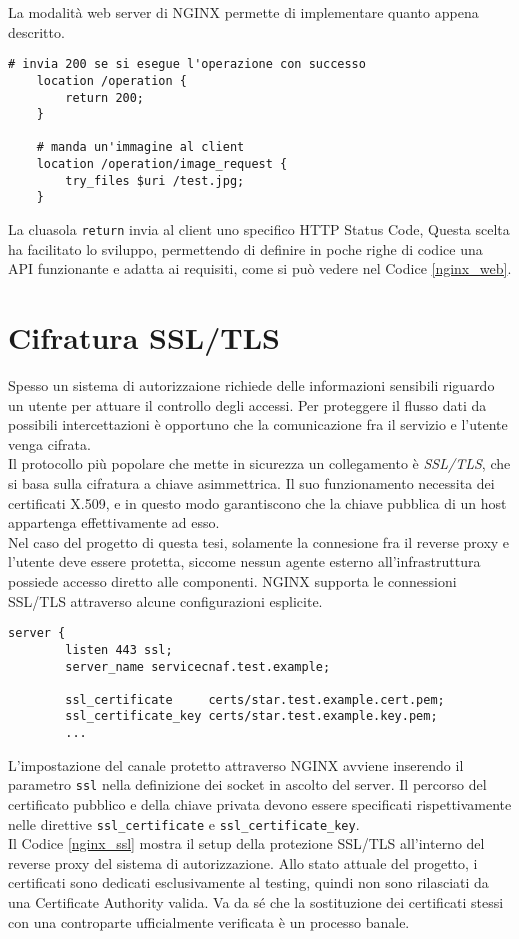 La modalità web server di NGINX permette di implementare quanto appena descritto.
\lstset{language=nginx}
\begin{lstlisting}[caption={Frammento di codice dell'application server},captionpos=b,label=nginx_web]
    # invia 200 se si esegue l'operazione con successo
    location /operation {
        return 200;
    }

    # manda un'immagine al client
    location /operation/image_request {
        try_files $uri /test.jpg;
    }
\end{lstlisting}
La cluasola \texttt{return} invia al client uno specifico HTTP Status Code,  
Questa scelta ha facilitato lo sviluppo, permettendo di definire in poche righe di codice una API funzionante e adatta ai requisiti,  
come si può vedere nel Codice \ref*{nginx_web}.

\section{Cifratura SSL/TLS}
Spesso un sistema di autorizzaione richiede delle informazioni sensibili riguardo un utente per attuare il controllo 
degli accessi. 
Per proteggere il flusso dati da possibili intercettazioni è opportuno che la comunicazione fra il servizio e l'utente venga cifrata. 
\\ Il protocollo più popolare che mette in sicurezza un collegamento \newline è \textit{SSL/TLS}, che si basa sulla cifratura a chiave asimmettrica. Il suo funzionamento necessita 
dei certificati X.509, e in questo modo garantiscono che la chiave pubblica di un host appartenga effettivamente ad esso. 
\\ Nel caso del progetto di questa tesi, solamente la connesione fra il reverse proxy e l'utente deve essere protetta, siccome nessun agente esterno
 all'infrastruttura possiede accesso diretto alle componenti.
NGINX supporta le connessioni SSL/TLS attraverso alcune configurazioni esplicite.

\begin{lstlisting}[caption={Configurazione di SSL},captionpos=b,label=nginx_ssl]
    server {
        listen 443 ssl;
        server_name servicecnaf.test.example;
        
        ssl_certificate     certs/star.test.example.cert.pem;
        ssl_certificate_key certs/star.test.example.key.pem;
        ...
\end{lstlisting}
L'impostazione del canale protetto attraverso NGINX avviene inserendo il parametro \texttt{ssl} nella definizione 
dei socket in ascolto del server. Il percorso del certificato pubblico e della chiave privata devono essere specificati 
rispettivamente nelle direttive \texttt{ssl\_certificate} e \texttt{ssl\_certificate\_key}. \\
Il Codice \ref*{nginx_ssl} mostra il setup della protezione SSL/TLS all'interno del reverse proxy del sistema di autorizzazione.
Allo stato attuale del progetto, i certificati sono dedicati esclusivamente al testing, quindi non sono rilasciati da 
una Certificate Authority valida. Va da sé che 
la sostituzione dei certificati stessi
con una controparte ufficialmente verificata è un processo banale.  


